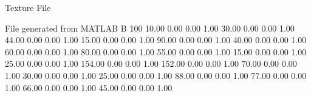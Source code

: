 Texture File

File generated from MATLAB
B 100
   10.00   0.00   0.00   1.00
   30.00   0.00   0.00   1.00
   44.00   0.00   0.00   1.00
   15.00   0.00   0.00   1.00
   90.00   0.00   0.00   1.00
   40.00   0.00   0.00   1.00
   60.00   0.00   0.00   1.00
   80.00   0.00   0.00   1.00
   55.00   0.00   0.00   1.00
   15.00   0.00   0.00   1.00
   25.00   0.00   0.00   1.00
   154.00   0.00   0.00   1.00
   152.00   0.00   0.00   1.00
   70.00   0.00   0.00   1.00
   30.00   0.00   0.00   1.00
   25.00   0.00   0.00   1.00
   88.00   0.00   0.00   1.00
   77.00   0.00   0.00   1.00
   66.00   0.00   0.00   1.00
   45.00   0.00   0.00   1.00